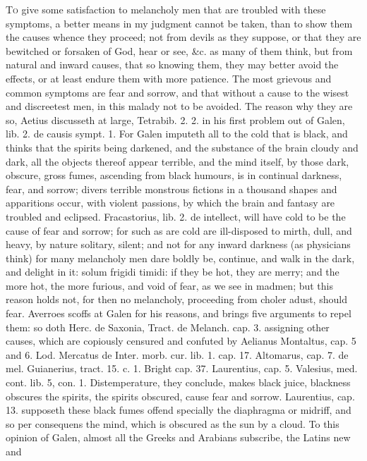 {\lettrine{T}{o} give some satisfaction to melancholy men that are troubled with
these symptoms, a better means in my judgment cannot be taken, than to
show them the causes whence they proceed; not from devils as they
suppose, or that they are bewitched or forsaken of God, hear or see,
\&c. as many of them think, but from natural and inward causes, that so
knowing them, they may better avoid the effects, or at least endure
them with more patience. The most grievous and common symptoms are fear
and sorrow, and that without a cause to the wisest and discreetest men,
in this malady not to be avoided. The reason why they are so, Aetius
discusseth at large, Tetrabib. 2. 2. in his first problem out of Galen,
lib. 2. de causis sympt. 1. For Galen imputeth all to the cold that is
black, and thinks that the spirits being darkened, and the substance of
the brain cloudy and dark, all the objects thereof appear terrible, and
the mind itself, by those dark, obscure, gross fumes, ascending
from black humours, is in continual darkness, fear, and sorrow; divers
terrible monstrous fictions in a thousand shapes and apparitions occur,
with violent passions, by which the brain and fantasy are troubled and
eclipsed. Fracastorius, lib. 2. de intellect, will have cold to
be the cause of fear and sorrow; for such as are cold are ill-disposed
to mirth, dull, and heavy, by nature solitary, silent; and not for any
inward darkness (as physicians think) for many melancholy men dare
boldly be, continue, and walk in the dark, and delight in it: solum
frigidi timidi: if they be hot, they are merry; and the more hot, the
more furious, and void of fear, as we see in madmen; but this reason
holds not, for then no melancholy, proceeding from choler adust, should
fear. Averroes scoffs at Galen for his reasons, and brings five
arguments to repel them: so doth Herc. de Saxonia, Tract. de Melanch.
cap. 3. assigning other causes, which are copiously censured and
confuted by Aelianus Montaltus, cap. 5 and 6. Lod. Mercatus de Inter.
morb. cur. lib. 1. cap. 17. Altomarus, cap. 7. de mel. Guianerius,
tract. 15. c. 1. Bright cap. 37. Laurentius, cap. 5. Valesius, med.
cont. lib. 5, con. 1. Distemperature, they conclude, makes black
juice, blackness obscures the spirits, the spirits obscured, cause fear
and sorrow. Laurentius, cap. 13. supposeth these black fumes offend
specially the diaphragma or midriff, and so per consequens the mind,
which is obscured as the sun by a cloud. To this opinion of
Galen, almost all the Greeks and Arabians subscribe, the Latins new and
}
